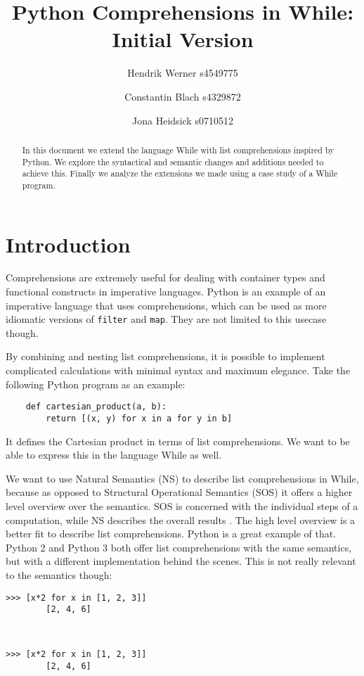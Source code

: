 \documentclass[12pt]{article}
\title{
    Python Comprehensions in While:\\
    Initial Version
}
\author{
    Hendrik Werner s4549775
    \and Constantin Blach s4329872
    \and Jona Heidsick s0710512
}
\newcommand\mono\texttt
\begin{document}
\maketitle

\begin{abstract}
\noindent %
In this document we extend the language While with list comprehensions inspired by Python. We explore the syntactical and semantic changes and additions needed to achieve this. Finally we analyze the extensions we made using a case study of a While program.
\end{abstract}

\section{Introduction}
Comprehensions are extremely useful for dealing with container types and functional constructs in imperative languages. Python is an example of an imperative language that uses comprehensions, which can be used as more idiomatic versions of \mono{filter} and \mono{map}. They are not limited to this usecase though.

By combining and nesting list comprehensions, it is possible to implement complicated calculations with minimal syntax and maximum elegance. Take the following Python program as an example:

\begin{lstlisting}
    def cartesian_product(a, b):
        return [(x, y) for x in a for y in b]
\end{lstlisting}

It defines the Cartesian product in terms of list comprehensions. We want to be able to express this in the language While as well.

We want to use Natural Semantics (NS) to describe list comprehensions in While, because as opposed to Structural Operational Semantics (SOS) it offers a higher level overview over the semantics. SOS is concerned with the individual steps of a computation, while NS describes the overall results \cite{wiley}. The high level overview is a better fit to describe list comprehensions. Python is a great example of that. Python 2 and Python 3 both offer list comprehensions with the same semantics, but with a different implementation behind the scenes. This is not really relevant to the semantics though:

\begin{minipage}[t]{.48\linewidth}
    \begin{lstlisting}[gobble=8, title=Python 2]
        >>> [x*2 for x in [1, 2, 3]]
        [2, 4, 6]
    \end{lstlisting}
\end{minipage}
\,
\begin{minipage}[t]{.48\linewidth}
    \begin{lstlisting}[gobble=8, title=Python 3]
        >>> [x*2 for x in [1, 2, 3]]
        [2, 4, 6]
    \end{lstlisting}
\end{minipage}
\end{document}

